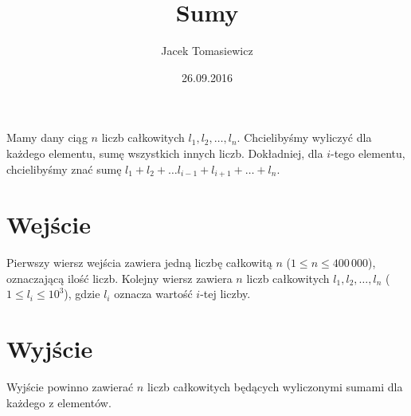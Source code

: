 \documentclass[zad,zawodnik,utf8]{sinol}
\title{Sumy}
\author{Jacek Tomasiewicz} %
\date{26.09.2016}
\begin{document}
\begin{tasktext}%
Mamy dany ciąg $n$ liczb całkowitych $l_1, l_2, \ldots, l_n$. Chcielibyśmy wyliczyć dla każdego elementu, sumę wszystkich innych liczb.
Dokładniej, dla $i$-tego elementu, chcielibyśmy znać sumę $l_1 + l_2 + \ldots l_{i-1} + l_{i+1} + \ldots + l_n$.

  \section{Wejście}
Pierwszy wiersz wejścia zawiera jedną liczbę całkowitą $n$ ($1 \leq n \leq 400\,000$), oznaczającą ilość liczb.
Kolejny wiersz zawiera $n$ liczb całkowitych $l_1, l_2, \ldots, l_n$ ($1 \leq l_i \leq 10^3$), gdzie $l_i$ oznacza wartość $i$-tej liczby.

  \section{Wyjście}
Wyjście powinno zawierać $n$ liczb całkowitych będących wyliczonymi sumami dla każdego z elementów.

\makecompactexample

\end{tasktext}
\end{document}
